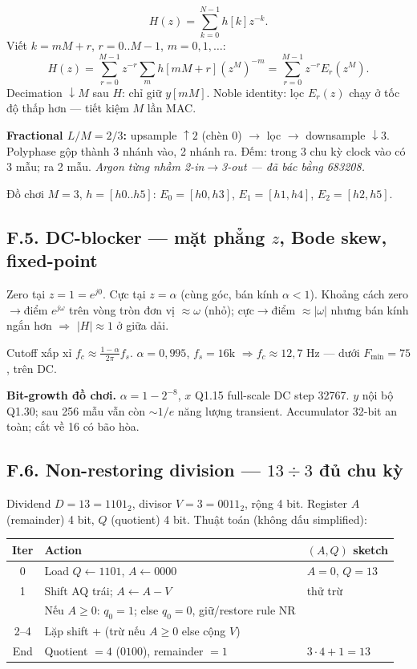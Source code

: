 \[
H(z)=\sum_{k=0}^{N-1}h[k]z^{-k}.
\]
Viết $k=mM+r$, $r=0..M-1$, $m=0,1,\ldots$:
\[
H(z)=\sum_{r=0}^{M-1}z^{-r}\sum_{m}h[mM+r](z^{M})^{-m}=\sum_{r=0}^{M-1}z^{-r}E_r(z^{M}).
\]
Decimation $\downarrow M$ sau $H$: chỉ giữ $y[mM]$. Noble identity: lọc $E_r(z)$ chạy ở tốc độ thấp hơn --- tiết kiệm $M$ lần MAC.

\textbf{Fractional $L/M=2/3$:} upsample $\uparrow2$ (chèn 0) $\to$ lọc $\to$ downsample $\downarrow3$. Polyphase gộp thành 3 nhánh vào, 2 nhánh ra. Đếm: trong 3 chu kỳ clock vào có 3 mẫu; ra 2 mẫu. \emph{Argon từng nhầm 2-in$\to$3-out --- đã bác bằng 683208.}

Đồ chơi $M=3$, $h=[h0..h5]$:
$E_0=[h0,h3]$, $E_1=[h1,h4]$, $E_2=[h2,h5]$.

\subsection*{F.5. DC-blocker --- mặt phẳng $z$, Bode skew, fixed-point}

Zero tại $z=1=e^{j0}$. Cực tại $z=\alpha$ (cùng góc, bán kính $\alpha<1$).
Khoảng cách zero$\to$điểm $e^{j\omega}$ trên vòng tròn đơn vị $\approx\omega$ (nhỏ); cực$\to$điểm $\approx|\omega|$ nhưng bán kính ngắn hơn $\Rightarrow$ $|H|\approx1$ ở giữa dải.

Cutoff xấp xỉ $f_c\approx\frac{1-\alpha}{2\pi}f_s$. $\alpha=0{,}995$, $f_s=16\text{k}$ $\Rightarrow f_c\approx12{,}7\text{ Hz}$ --- dưới $F_{\min}=75$, trên DC.

\textbf{Bit-growth đồ chơi.} $\alpha=1-2^{-8}$, $x$ Q1.15 full-scale DC step 32767. $y$ nội bộ Q1.30; sau 256 mẫu vẫn còn $\sim1/e$ năng lượng transient. Accumulator 32-bit an toàn; cắt về 16 có bão hòa.

\subsection*{F.6. Non-restoring division --- $13\div3$ đủ chu kỳ}

Dividend $D=13=1101_2$, divisor $V=3=0011_2$, rộng 4 bit. Register $A$ (remainder) 4 bit, $Q$ (quotient) 4 bit. Thuật toán (không dấu simplified):

\begin{center}\small
\begin{tabular}{@{}cll@{}}
\toprule
Iter & Action & $(A,Q)$ sketch \\
\midrule
0 & Load $Q\leftarrow1101$, $A\leftarrow0000$ & $A=0$, $Q=13$ \\
1 & Shift AQ trái; $A\leftarrow A-V$ & thử trừ \\
  & Nếu $A\ge0$: $q_0=1$; else $q_0=0$, giữ/restore rule NR & \\
2--4 & Lặp shift + (trừ nếu $A\ge0$ else cộng $V$) & \\
End & Quotient $=4$ ($0100$), remainder $=1$ & $3\cdot4+1=13$ \\
\bottomrule
\end{tabular}
\end{center}

